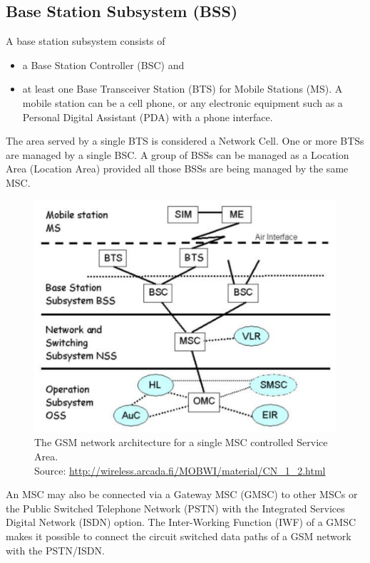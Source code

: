 \subsection{Base Station Subsystem (BSS)}

A base station subsystem consists of
\begin{itemize}[noitemsep,topsep=0pt,parsep=0pt,partopsep=0pt] 
\item a Base Station Controller (BSC) and
\item at least one Base Transceiver Station (BTS) for Mobile Stations (MS). A mobile station can be a cell phone, or any electronic equipment such as a Personal Digital Assistant (PDA) with a phone interface.
\end{itemize}

The area served by a single BTS is considered a Network Cell. One or more BTSs are managed by a single BSC.  A group of BSSs can be managed as a Location Area (Location Area) provided all those BSSs are being managed by the same MSC.


\begin{figure}
\centering
\includegraphics[scale=0.4]{archMSCServiceArea}
\caption[Network architecture for a single MSC Service Area]{The GSM network architecture for a single MSC controlled Service Area.\\
\footnotesize{Source: \url{http://wireless.arcada.fi/MOBWI/material/CN\_1\_2.html}}}
\end{figure}


An MSC may also be connected via a Gateway MSC (GMSC) to other MSCs or the Public Switched Telephone Network (PSTN) with the Integrated Services Digital Network (ISDN) option. The Inter-Working Function (IWF) of a GMSC makes it possible to connect the circuit switched data paths of a GSM network with the PSTN/ISDN.

